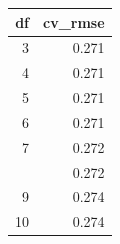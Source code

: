 
\begin{tabular}{rr}
\toprule
df & cv\_rmse\\
\midrule
3 & 0.271\\
4 & 0.271\\
5 & 0.271\\
6 & 0.271\\
7 & 0.272\\
\addlinespace
8 & 0.272\\
9 & 0.274\\
10 & 0.274\\
\bottomrule
\end{tabular}

